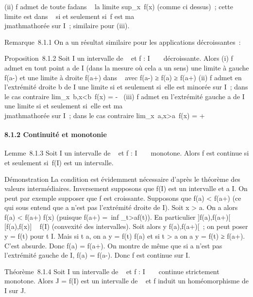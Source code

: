 \documentclass[]{article}
\begin{document}
(ii) f admet de toute fa\ccon dans
\overline{}~ la limite
sup_x\inI~f(x) (comme ci dessus)~; cette
limite est dans ~ si et seulement si~f est ma\\jmathmathorée sur I~; similaire
pour (iii).

Remarque~8.1.1 On a un résultat similaire pour les applications
décroissantes~:

Proposition~8.1.2 Soit I un intervalle de ~ et f : I \rightarrow~ ~ décroissante.
Alors (i) f admet en tout point a de I (dans la mesure où cela a un
sens) une limite à gauche f(a-) et une limite à droite f(a+) dans ~ avec
f(a-) ≥ f(a) ≥ f(a+) (ii) f admet en l'extrémité droite b de I une
limite si et seulement si~elle est minorée sur I~; dans le cas contraire
lim_x\rightarrow~b,x\textless{}b~f(x) = -\infty~ (iii)
f admet en l'extrémité gauche a de I une limite si et seulement si~elle
est ma\\jmathmathorée sur I~; dans le cas contraire
lim_x\rightarrow~a,x\textgreater{}a~f(x) = +\infty~

\paragraph{8.1.2 Continuité et monotonie}

Lemme~8.1.3 Soit I un intervalle de ~ et f : I \rightarrow~ ~ monotone. Alors f est
continue si et seulement si~f(I) est un intervalle.

Démonstration La condition est évidemment nécessaire d'après le théorème
des valeurs intermédiaires. Inversement supposons que f(I) est un
intervalle et a \in I. On peut par exemple supposer que f est croissante.
Supposons que f(a) \textless{} f(a+) (ce qui sous entend que a n'est pas
l'extrémité droite de I). Soit x \textgreater{} a. On a alors f(a)
\textless{} f(a+) \leq f(x) (puisque f(a+) =\
inf _t\textgreater{}af(t)). En particulier {]}f(a),f(a+){[}\subset~
{[}f(a),f(x){]} \subset~ f(I) (convexité des intervalles). Soit alors y
\in{]}f(a),f(a+){[}~; on peut poser y = f(t) pour t \in I. Mais si t \leq a, on
a y = f(t) \leq f(a) et si t \textgreater{} a on a y = f(t) ≥ f(a+). C'est
absurde. Donc f(a) = f(a+). On montre de même que si a n'est pas
l'extrémité gauche de I, f(a) = f(a-). Donc f est continue sur I.

Théorème~8.1.4 Soit I un intervalle de ~ et f : I \rightarrow~ ~ continue
strictement monotone. Alors J = f(I) est un intervalle de \mathbb{R}~ et f induit
un homéomorphisme de I sur J.
\end{document}
